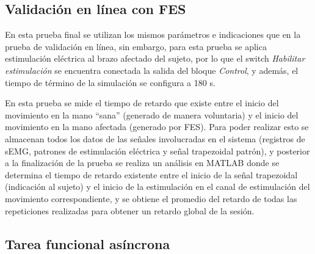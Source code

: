 \newpage
\subsection{Validación en línea con FES}\label{Sec: TareaObj}
En esta prueba final se utilizan los mismos parámetros e indicaciones que en la prueba de validación en línea, sin embargo, para esta prueba se aplica estimulación eléctrica al brazo afectado del sujeto, por lo que el switch \emph{Habilitar estimulación} se encuentra conectada la salida del bloque \emph{Control}, y además, el tiempo de término de la simulación se configura a 180 s.

En esta prueba se mide el tiempo de retardo que existe entre el inicio del movimiento en la mano ``sana'' (generado de manera voluntaria) y el inicio del movimiento en la mano afectada (generado por FES). Para poder realizar esto se almacenan todos los datos de las señales involucradas en el sistema (registros de sEMG, patrones de estimulación eléctrica y señal trapezoidal patrón), y posterior a la finalización de la prueba se realiza un análisis en MATLAB\textregistered \; donde se determina el tiempo de retardo existente entre el inicio de la señal trapezoidal (indicación al sujeto) y el inicio de la estimulación en el canal de estimulación del movimiento correspondiente, y se obtiene el promedio del retardo de todas las repeticiones realizadas para obtener un retardo global de la sesión.

\subsection{Tarea funcional asíncrona}\label{Sec: TareaFunAsin}


